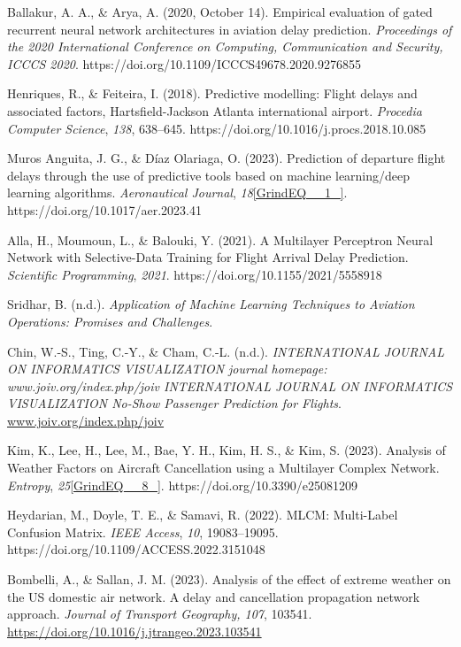 \documentclass[conference]{IEEEtran}
\begin{document}
\noindent [22] Ballakur, A. A., \& Arya, A. (2020, October 14). Empirical evaluation of gated recurrent neural network architectures in aviation delay prediction. \textit{Proceedings of the 2020 International Conference on Computing, Communication and Security, ICCCS 2020}. https://doi.org/10.1109/ICCCS49678.2020.9276855

\noindent [23] Henriques, R., \& Feiteira, I. (2018). Predictive modelling: Flight delays and associated factors, Hartsfield-Jackson Atlanta international airport. \textit{Procedia Computer Science}, \textit{138}, 638--645. https://doi.org/10.1016/j.procs.2018.10.085

\noindent 

\noindent [24]  Muros Anguita, J. G., \& D\'{i}az Olariaga, O. (2023). Prediction of departure flight delays through the use of predictive tools based on machine learning/deep learning algorithms. \textit{Aeronautical Journal}, \textit{18}\eqref{GrindEQ__1_}. https://doi.org/10.1017/aer.2023.41

\noindent [25]  Alla, H., Moumoun, L., \& Balouki, Y. (2021). A Multilayer Perceptron Neural Network with Selective-Data Training for Flight Arrival Delay Prediction. \textit{Scientific Programming}, \textit{2021}. https://doi.org/10.1155/2021/5558918

\noindent [26] Sridhar, B. (n.d.). \textit{Application of Machine Learning Techniques to Aviation Operations: Promises and Challenges}.

\noindent [27] Chin, W.-S., Ting, C.-Y., \& Cham, C.-L. (n.d.). \textit{INTERNATIONAL JOURNAL ON INFORMATICS VISUALIZATION journal homepage: www.joiv.org/index.php/joiv INTERNATIONAL JOURNAL ON INFORMATICS VISUALIZATION No-Show Passenger Prediction for Flights}. \url{www.joiv.org/index.php/joiv}



\noindent [28]  Kim, K., Lee, H., Lee, M., Bae, Y. H., Kim, H. S., \& Kim, S. (2023). Analysis of Weather Factors on Aircraft Cancellation using a Multilayer Complex Network. \textit{Entropy}, \textit{25}\eqref{GrindEQ__8_}. https://doi.org/10.3390/e25081209

\noindent 

\noindent 

\noindent [29]  Heydarian, M., Doyle, T. E., \& Samavi, R. (2022). MLCM: Multi-Label Confusion Matrix. \textit{IEEE Access}, \textit{10}, 19083--19095. https://doi.org/10.1109/ACCESS.2022.3151048

\noindent [30] Bombelli, A., \& Sallan, J. M. (2023). Analysis of the effect of extreme weather on the US domestic air network. A delay and cancellation propagation network approach. \textit{Journal of Transport Geography, 107}, 103541. \url{https://doi.org/10.1016/j.jtrangeo.2023.103541}
\end{document}
